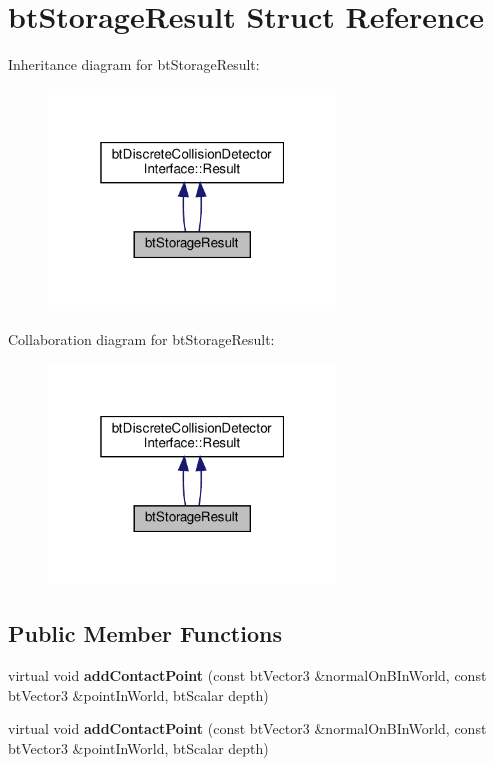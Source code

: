 \hypertarget{structbtStorageResult}{}\section{bt\+Storage\+Result Struct Reference}
\label{structbtStorageResult}


Inheritance diagram for bt\+Storage\+Result\+:
\nopagebreak
\begin{figure}[H]
\begin{center}
\leavevmode
\includegraphics[width=217pt]{structbtStorageResult__inherit__graph}
\end{center}
\end{figure}


Collaboration diagram for bt\+Storage\+Result\+:
\nopagebreak
\begin{figure}[H]
\begin{center}
\leavevmode
\includegraphics[width=217pt]{structbtStorageResult__coll__graph}
\end{center}
\end{figure}
\subsection*{Public Member Functions}
\begin{DoxyCompactItemize}
\item 
\mbox{\label{structbtStorageResult_a81f65a5d0d472448e8bf1a1bb407984d}} 
virtual void {\bfseries add\+Contact\+Point} (const bt\+Vector3 \&normal\+On\+B\+In\+World, const bt\+Vector3 \&point\+In\+World, bt\+Scalar depth)
\item 
\mbox{\label{structbtStorageResult_a81f65a5d0d472448e8bf1a1bb407984d}} 
virtual void {\bfseries add\+Contact\+Point} (const bt\+Vector3 \&normal\+On\+B\+In\+World, const bt\+Vector3 \&point\+In\+World, bt\+Scalar depth)
\end{DoxyCompactItemize}
